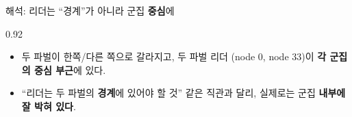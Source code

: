 \begin{frame}{해석: 리더는 ``경계''가 아니라 군집 \textbf{중심}에}
\begin{center}\begin{varwidth}{0.92\textwidth}
  \begin{itemize}
    \item 두 파벌이 한쪽/다른 쪽으로 갈라지고, 두 파벌 리더
      (node 0, node 33)이 \textbf{각 군집의 중심 부근}에 있다.
    
    \item ``리더는 두 파벌의 \textbf{경계}에 있어야 할 것'' 같은
      직관과 달리, 실제로는 군집 \textbf{내부에 잘 박혀 있다}.
    
  \end{itemize}
\end{varwidth}\end{center}
\end{frame}
